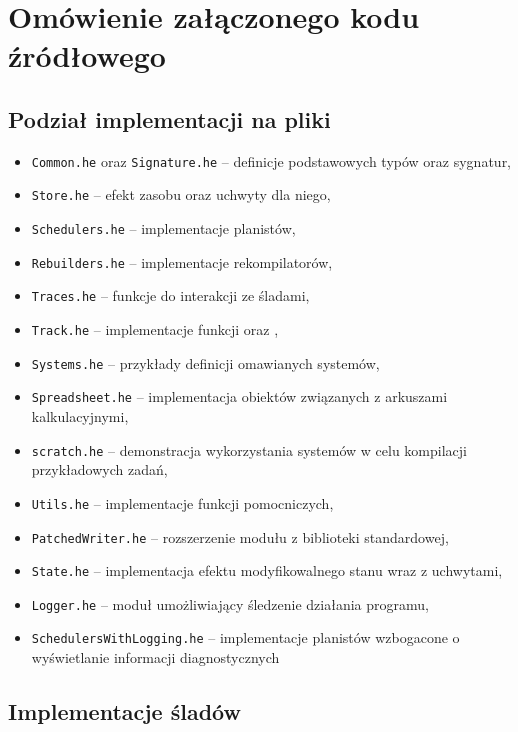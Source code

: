 
\newcommand{\file}[1]{\texttt{#1}}

\chapter{Omówienie załączonego kodu źródłowego}

\section{Podział implementacji na pliki}

\begin{itemize}
\item \file{Common.he} oraz \file{Signature.he} -- definicje podstawowych typów oraz sygnatur,
\item \file{Store.he} -- efekt zasobu oraz uchwyty dla niego,
\item \file{Schedulers.he} -- implementacje planistów,
\item \file{Rebuilders.he} -- implementacje rekompilatorów,
\item \file{Traces.he} -- funkcje do interakcji ze śladami,
\item \file{Track.he} -- implementacje funkcji  oraz ,
\item \file{Systems.he} -- przykłady definicji omawianych systemów,
\item \file{Spreadsheet.he} -- implementacja obiektów związanych z arkuszami kalkulacyjnymi,
\item \file{scratch.he} -- demonstracja wykorzystania systemów w celu kompilacji przykładowych zadań,
\item \file{Utils.he} -- implementacje funkcji pomocniczych,
\item \file{PatchedWriter.he} -- rozszerzenie modułu  z biblioteki standardowej,
\item \file{State.he} -- implementacja efektu modyfikowalnego stanu wraz z uchwytami,
\item \file{Logger.he} -- moduł umożliwiający śledzenie działania programu,
\item \file{SchedulersWithLogging.he} -- implementacje planistów wzbogacone o wyświetlanie informacji diagnostycznych
\end{itemize}

\section{Implementacje śladów}

